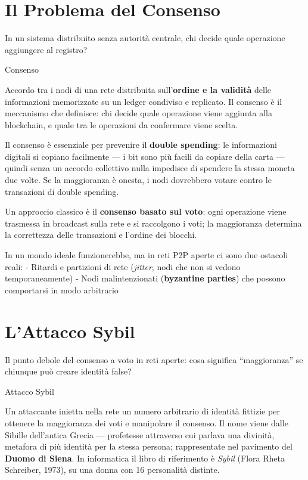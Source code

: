 \documentclass[
  italian,
  openany]{book}
\begin{document}
\section{Il Problema del Consenso}\label{il-problema-del-consenso}

In un sistema distribuito senza autorità centrale, chi decide quale
operazione aggiungere al registro?

\begin{calloutdefinition}{Consenso}

Accordo tra i nodi di una rete distribuita sull'\textbf{ordine e la
validità} delle informazioni memorizzate su un ledger condiviso e
replicato. Il consenso è il meccanismo che definisce: chi decide quale
operazione viene aggiunta alla blockchain, e quale tra le operazioni da
confermare viene scelta.

\end{calloutdefinition}

Il consenso è essenziale per prevenire il \textbf{double spending}: le
informazioni digitali si copiano facilmente --- i bit sono più facili da
copiare della carta --- quindi senza un accordo collettivo nulla
impedisce di spendere la stessa moneta due volte. Se la maggioranza è
onesta, i nodi dovrebbero votare contro le transazioni di double
spending.

Un approccio classico è il \textbf{consenso basato sul voto}: ogni
operazione viene trasmessa in broadcast sulla rete e si raccolgono i
voti; la maggioranza determina la correttezza delle transazioni e
l'ordine dei blocchi.

In un mondo ideale funzionerebbe, ma in reti P2P aperte ci sono due
ostacoli reali: - Ritardi e partizioni di rete (\emph{jitter}, nodi che
non si vedono temporaneamente) - Nodi malintenzionati (\textbf{byzantine
parties}) che possono comportarsi in modo arbitrario

\section{L'Attacco Sybil}\label{lattacco-sybil}

Il punto debole del consenso a voto in reti aperte: cosa significa
``maggioranza'' se chiunque può creare identità false?

\begin{calloutdefinition}{Attacco Sybil}

Un attaccante inietta nella rete un numero arbitrario di identità
fittizie per ottenere la maggioranza dei voti e manipolare il consenso.
Il nome viene dalle Sibille dell'antica Grecia --- profetesse attraverso
cui parlava una divinità, metafora di più identità per la stessa
persona; rappresentate nel pavimento del \textbf{Duomo di Siena}. In
informatica il libro di riferimento è \emph{Sybil} (Flora Rheta
Schreiber, 1973), su una donna con 16 personalità distinte.

\end{calloutdefinition}
\end{document}
